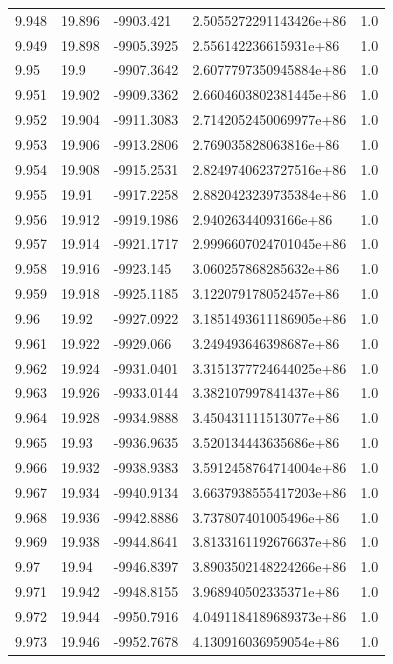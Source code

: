 \begin{tabular}{lllll}
9.948 & 19.896 & -9903.421 & 2.5055272291143426e+86 & 1.0 \\
9.949 & 19.898 & -9905.3925 & 2.556142236615931e+86 & 1.0 \\
9.95 & 19.9 & -9907.3642 & 2.6077797350945884e+86 & 1.0 \\
9.951 & 19.902 & -9909.3362 & 2.6604603802381445e+86 & 1.0 \\
9.952 & 19.904 & -9911.3083 & 2.7142052450069977e+86 & 1.0 \\
9.953 & 19.906 & -9913.2806 & 2.769035828063816e+86 & 1.0 \\
9.954 & 19.908 & -9915.2531 & 2.8249740623727516e+86 & 1.0 \\
9.955 & 19.91 & -9917.2258 & 2.8820423239735384e+86 & 1.0 \\
9.956 & 19.912 & -9919.1986 & 2.94026344093166e+86 & 1.0 \\
9.957 & 19.914 & -9921.1717 & 2.9996607024701045e+86 & 1.0 \\
9.958 & 19.916 & -9923.145 & 3.060257868285632e+86 & 1.0 \\
9.959 & 19.918 & -9925.1185 & 3.122079178052457e+86 & 1.0 \\
9.96 & 19.92 & -9927.0922 & 3.1851493611186905e+86 & 1.0 \\
9.961 & 19.922 & -9929.066 & 3.249493646398687e+86 & 1.0 \\
9.962 & 19.924 & -9931.0401 & 3.3151377724644025e+86 & 1.0 \\
9.963 & 19.926 & -9933.0144 & 3.382107997841437e+86 & 1.0 \\
9.964 & 19.928 & -9934.9888 & 3.450431111513077e+86 & 1.0 \\
9.965 & 19.93 & -9936.9635 & 3.520134443635686e+86 & 1.0 \\
9.966 & 19.932 & -9938.9383 & 3.5912458764714004e+86 & 1.0 \\
9.967 & 19.934 & -9940.9134 & 3.6637938555417203e+86 & 1.0 \\
9.968 & 19.936 & -9942.8886 & 3.737807401005496e+86 & 1.0 \\
9.969 & 19.938 & -9944.8641 & 3.8133161192676637e+86 & 1.0 \\
9.97 & 19.94 & -9946.8397 & 3.8903502148224266e+86 & 1.0 \\
9.971 & 19.942 & -9948.8155 & 3.968940502335371e+86 & 1.0 \\
9.972 & 19.944 & -9950.7916 & 4.0491184189689373e+86 & 1.0 \\
9.973 & 19.946 & -9952.7678 & 4.130916036959054e+86 & 1.0 \\

\end{tabular}
